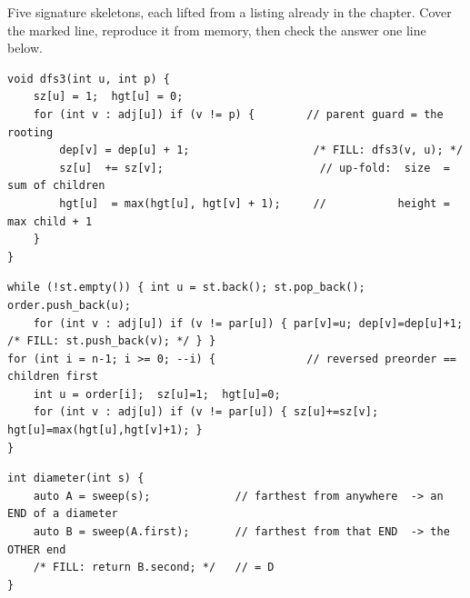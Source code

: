 
Five signature skeletons, each lifted from a listing already in the chapter. Cover the
marked line, reproduce it from memory, then check the answer one line below.

\begin{lstlisting}[caption={Drill 1 -- the measures DFS: down-push, up-fold (from \coderef{c09-dfs3})}]
void dfs3(int u, int p) {
    sz[u] = 1;  hgt[u] = 0;
    for (int v : adj[u]) if (v != p) {        // parent guard = the rooting
        dep[v] = dep[u] + 1;                   /* FILL: dfs3(v, u); */
        sz[u]  += sz[v];                        // up-fold:  size  = sum of children
        hgt[u]  = max(hgt[u], hgt[v] + 1);     //           height = max child + 1
    }
}
\end{lstlisting}

\begin{lstlisting}[caption={Drill 2 -- the chain-safe two-phase DFS (from \coderef{c09-iter})}]
while (!st.empty()) { int u = st.back(); st.pop_back(); order.push_back(u);
    for (int v : adj[u]) if (v != par[u]) { par[v]=u; dep[v]=dep[u]+1; /* FILL: st.push_back(v); */ } }
for (int i = n-1; i >= 0; --i) {              // reversed preorder == children first
    int u = order[i];  sz[u]=1;  hgt[u]=0;
    for (int v : adj[u]) if (v != par[u]) { sz[u]+=sz[v]; hgt[u]=max(hgt[u],hgt[v]+1); }
}
\end{lstlisting}

\begin{lstlisting}[caption={Drill 3 -- the two sweeps (from \coderef{c09-sweep})}]
int diameter(int s) {
    auto A = sweep(s);             // farthest from anywhere  -> an END of a diameter
    auto B = sweep(A.first);       // farthest from that END  -> the OTHER end
    /* FILL: return B.second; */   // = D
}
\end{lstlisting}

